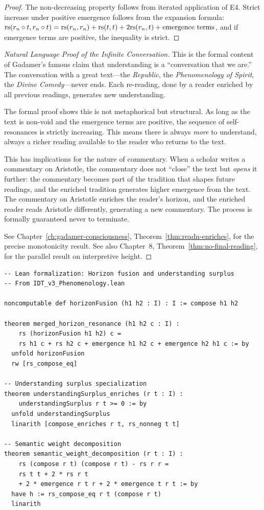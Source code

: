 \begin{proof}
The non-decreasing property follows from iterated application of E4.
Strict increase under positive emergence follows from the expansion formula:
$\mathrm{rs}(r_n \circ t, r_n \circ t) = \mathrm{rs}(r_n, r_n) + \mathrm{rs}(t, t) + 2\mathrm{rs}(r_n, t) + \text{emergence terms}$,
and if emergence terms are positive, the inequality is strict.
\end{proof}

\begin{proof}[Natural Language Proof of the Infinite Conversation]
This is the formal content of Gadamer's famous claim that understanding is
a ``conversation that we are.''  The conversation with a great text---the
\textit{Republic}, the \textit{Phenomenology of Spirit}, the \textit{Divine
Comedy}---never ends.  Each re-reading, done by a reader enriched by all
previous readings, generates new understanding.

The formal proof shows this is not metaphorical but structural.  As long as
the text is non-void and the emergence terms are positive, the sequence of
self-resonances is strictly increasing.  This means there is always
\emph{more} to understand, always a richer reading available to the reader
who returns to the text.

This has implications for the nature of commentary.  When a scholar writes
a commentary on Aristotle, the commentary does not ``close'' the text but
\emph{opens} it further: the commentary becomes part of the tradition that
shapes future readings, and the enriched tradition generates higher emergence
from the text.  The commentary on Aristotle enriches the reader's horizon,
and the enriched reader reads Aristotle differently, generating a new
commentary.  The process is formally guaranteed never to terminate.

See Chapter~\ref{ch:gadamer-consciousness},
Theorem~\ref{thm:readn-enriches}, for the precise monotonicity result.
See also Chapter~8, Theorem~\ref{thm:no-final-reading}, for the parallel
result on interpretive height.
\end{proof}

\begin{lstlisting}
-- Lean formalization: Horizon fusion and understanding surplus
-- From IDT_v3_Phenomenology.lean

noncomputable def horizonFusion (h1 h2 : I) : I := compose h1 h2

theorem merged_horizon_resonance (h1 h2 c : I) :
    rs (horizonFusion h1 h2) c =
    rs h1 c + rs h2 c + emergence h1 h2 c + emergence h2 h1 c := by
  unfold horizonFusion
  rw [rs_compose_eq]

-- Understanding surplus specialization
theorem understandingSurplus_enriches (r t : I) :
    understandingSurplus r t >= 0 := by
  unfold understandingSurplus
  linarith [compose_enriches r t, rs_nonneg t t]

-- Semantic weight decomposition  
theorem semantic_weight_decomposition (r t : I) :
    rs (compose r t) (compose r t) - rs r r =
    rs t t + 2 * rs r t
    + 2 * emergence r t r + 2 * emergence t r t := by
  have h := rs_compose_eq r t (compose r t)
  linarith
\end{lstlisting}




